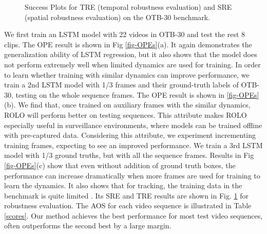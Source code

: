 \documentclass{article}
\begin{document}
\begin{figure}[!ht]
	\centering
	\caption{Success Plots for TRE (temporal robustness evaluation) and SRE (spatial robustness evaluation) on the OTB-30 benchmark.}
	\label{fig-robustness-eval}
\end{figure}
We first train an LSTM model with 22 videos in OTB-30 and test the rest 8 clips. 
The OPE result is shown in Fig \ref{fig-OPEs}(a). It again demonstrates the generalization ability of LSTM regression, but it also shows that %
the model does not perform extremely well
when limited dynamics are used for training.
In order to learn whether training with similar dynamics can improve performance, we train a 2nd LSTM model with 1/3 frames and their ground-truth labels of OTB-30, testing on the whole sequence frames. The OPE result is shown in \ref{fig-OPEs}(b).   
We find that, once trained on auxiliary frames with the similar dynamics, ROLO will perform better on testing sequences. This attribute makes ROLO especially useful in surveillance environments, where models can be trained offline with pre-captured data. 
Considering this attribute, we experiment incrementing training frames, expecting to see an improved performance. We train a 3rd LSTM model with 1/3 ground truths, but with all the sequence frames. Results in Fig \ref{fig-OPEs}(c) show that even without addition of ground truth boxes, the performance can increase dramatically when more frames are used for training to learn the dynamics. 
It also shows that for tracking, the training data in the benchmark is quite limited \citep{nam2015learning}. 
Its SRE and TRE results are shown in Fig. \ref{fig-robustness-eval} for robustness evaluation.
The AOS for each video sequence is illustrated in Table \ref{scores}. Our method achieves the best performance for most test video sequences, often outperforms the second best by a large margin.
\end{document}
